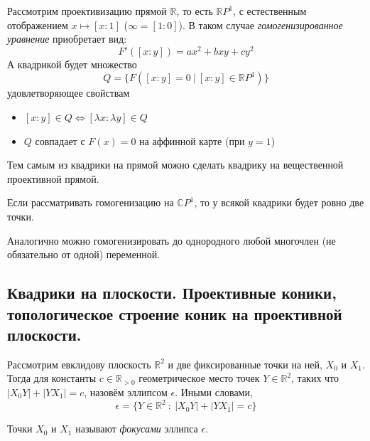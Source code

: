 \documentclass[11pt]{article}
\begin{document}
    Рассмотрим проективизацию прямой $\mathbb{R}$, то есть $ \mathbb{R}P^1$, с естественным отображением $x \mapsto [x:1]$ ($\infty = [1:0]$). В таком случае \emph{гомогенизированное уравнение} приобретает вид:
    \begin{equation*}
        F'([x:y]) = ax^2 + bxy + cy^2
    \end{equation*}
    А квадрикой будет множество
    \begin{equation*}
        Q = \{F([x : y] = 0 \ |\ [x:y] \in \mathbb{R}P^1)\}
    \end{equation*}
    удовлетворяющее свойствам
    \begin{itemize}
        \item $[x:y] \in Q \Longleftrightarrow [\lambda x:\lambda y] \in Q$
        \item $Q$ совпадает с $F(x) = 0$ на аффинной карте (при $y = 1$)
    \end{itemize}
    Тем самым из квадрики на прямой можно сделать квадрику на вещественной проективной прямой.

    \begin{remark}
    Если рассматривать гомогенизацию на $\mathbb{C}P^1$, то у всякой квадрики будет ровно две точки.
    \end{remark}

    \begin{remark}
    Аналогично можно гомогенизировать до однородного любой многочлен (не обязательно от одной) переменной.
    \end{remark}

    \subsection{Квадрики на плоскости. Проективные коники, топологическое строение коник на проективной плоскости. }

    \begin{definition}
    Рассмотрим евклидову плоскость $\mathbb{R}^2$ и две фиксированные точки на ней, $X_0$ и $X_1$. Тогда для константы $c \in \mathbb{R}_{>0}$ геометрическое место точек $Y \in \mathbb{R}^2$, таких что $|X_0Y| + |YX_1| = c$, назовём эллипсом $\epsilon$. Иными словами,
    \begin{equation*}
        \epsilon = \{Y \in \mathbb{R}^2 \ :\ |X_0Y| + |YX_1| = c\}
    \end{equation*}
    \end{definition}

    \begin{remark}
    Точки $X_0$ и $X_1$ называют \emph{фокусами} эллипса $\epsilon$.
    \end{remark}
\end{document}
